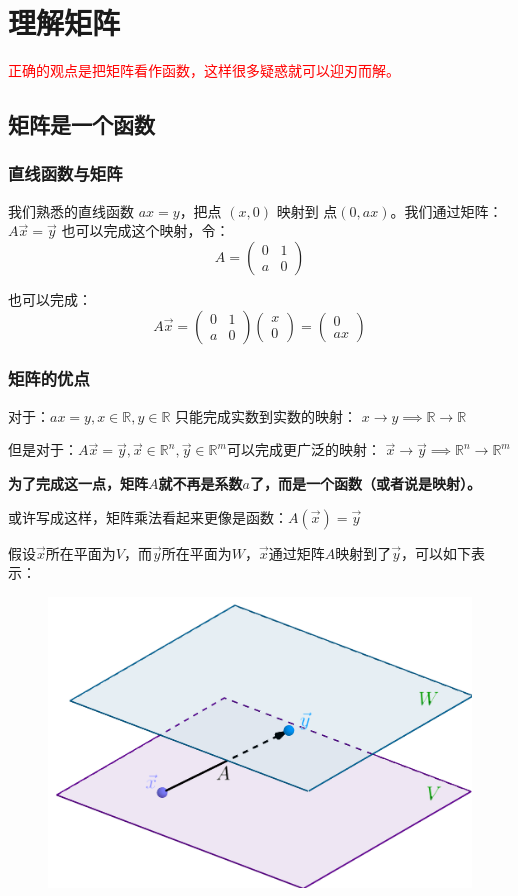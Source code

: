 \documentclass[12pt]{article}
\begin{document}
\section{理解矩阵\cite{How_To_Understand_Matrix_Multiplication}}
\textcolor{red}{正确的观点是把矩阵看作函数，这样很多疑惑就可以迎刃而解。}

\subsection{矩阵是一个函数}
\subsubsection{直线函数与矩阵}
我们熟悉的直线函数 $ax = y$，把点 $(x,0)$ 映射到 点$(0,ax)$。我们通过矩阵：$A\vec{x} = \vec{y}$ 也可以完成这个映射，令：
$$
A=
\begin{pmatrix}
0&1\\
a&0
\end{pmatrix}
$$

也可以完成：
$$
A\vec{x}=
\begin{pmatrix}
0&1\\
a&0
\end{pmatrix}
\begin{pmatrix}
x\\
0
\end{pmatrix}
=
\begin{pmatrix}
0\\
ax
\end{pmatrix}
$$

\subsubsection{矩阵的优点}
对于：$ax=y,x\in\mathbb{R},y\in\mathbb{R}$ 只能完成实数到实数的映射：
$x\to y\implies \mathbb{R}\to\mathbb{R}$

但是对于：$A\vec{x}=\vec{y},\vec{x}\in\mathbb{R}^n,\vec{y}\in\mathbb{R}^m$可以完成更广泛的映射：
$\vec{x}\to \vec{y}\implies \mathbb{R}^n\to\mathbb{R}^m$

\textbf{为了完成这一点，矩阵$A$就不再是系数$a$了，而是一个函数（或者说是映射）。}

或许写成这样，矩阵乘法看起来更像是函数：$A(\vec{x})=\vec{y}$

假设$\vec{x}$所在平面为$V$，而$\vec{y}$所在平面为$W$，$\vec{x}$通过矩阵$A$映射到了$\vec{y}$，可以如下表示：
\begin{figure}[H]
\centering
\includegraphics[width=.5\textwidth]{fig/UnderstandMatrixMultiplication_1.png} 
\end{figure}
\end{document}
